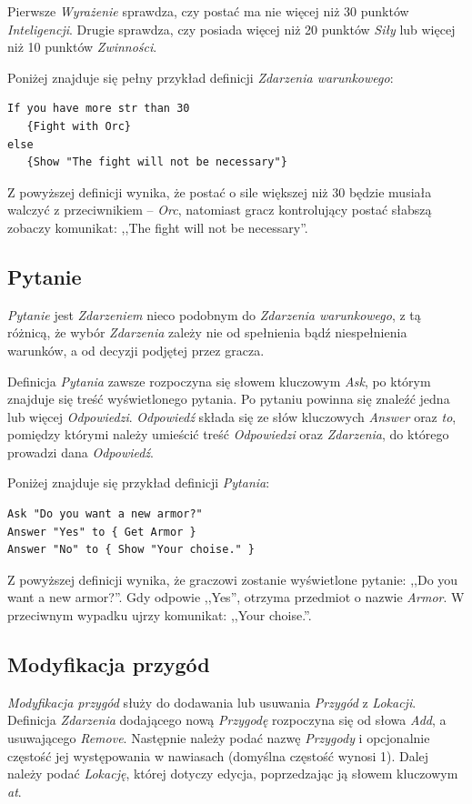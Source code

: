 \documentclass[openright]{xmgr}
\begin{document}
Pierwsze \textit{Wyrażenie} sprawdza, czy postać ma nie więcej niż 30 punktów \textit{Inteligencji}. Drugie sprawdza, czy posiada więcej niż 20 punktów \textit{Siły} lub więcej niż 10 punktów \textit{Zwinności}.

Poniżej znajduje się pełny przykład definicji \textit{Zdarzenia warunkowego}: 
\begin{verbatim}
If you have more str than 30 
   {Fight with Orc}
else 
   {Show "The fight will not be necessary"}
\end{verbatim}

Z powyższej definicji wynika, że postać o sile większej niż 30 będzie musiała walczyć z przeciwnikiem -- \textit{Orc}, natomiast gracz kontrolujący postać słabszą zobaczy komunikat: ,,The fight will not be necessary''.

\subsection*{Pytanie}
\textit{Pytanie} jest \textit{Zdarzeniem} nieco podobnym do \textit{Zdarzenia warunkowego}, z tą różnicą, że wybór \textit{Zdarzenia} zależy nie od spełnienia bądź niespełnienia warunków, a od decyzji podjętej przez gracza.

Definicja \textit{Pytania} zawsze rozpoczyna się słowem kluczowym \textit{Ask}, po którym znajduje się treść wyświetlonego pytania. Po pytaniu powinna się znaleźć jedna lub więcej \textit{Odpowiedzi}. \textit{Odpowiedź} składa się ze słów kluczowych \textit{Answer} oraz \textit{to}, pomiędzy którymi należy umieścić treść \textit{Odpowiedzi} oraz \textit{Zdarzenia}, do którego prowadzi dana \textit{Odpowiedź}. 

Poniżej znajduje się przykład definicji \textit{Pytania}:
\begin{verbatim}
Ask "Do you want a new armor?"
Answer "Yes" to { Get Armor }
Answer "No" to { Show "Your choise." }
\end{verbatim}

Z powyższej definicji wynika, że graczowi zostanie wyświetlone pytanie: ,,Do you want a new armor?''. Gdy odpowie ,,Yes'', otrzyma przedmiot o nazwie \textit{Armor}. W przeciwnym wypadku ujrzy komunikat: ,,Your choise.''.

\subsection*{Modyfikacja przygód}
\textit{Modyfikacja przygód} służy do dodawania lub usuwania \textit{Przygód} z \textit{Lokacji}. Definicja \textit{Zdarzenia} dodającego nową \textit{Przygodę} rozpoczyna się od słowa \textit{Add}, a usuwającego \textit{Remove}. Następnie należy podać nazwę \textit{Przygody} i opcjonalnie częstość jej występowania w nawiasach (domyślna częstość wynosi 1). Dalej należy podać \textit{Lokację}, której dotyczy edycja, poprzedzając ją słowem kluczowym \textit{at}.
\end{document}
